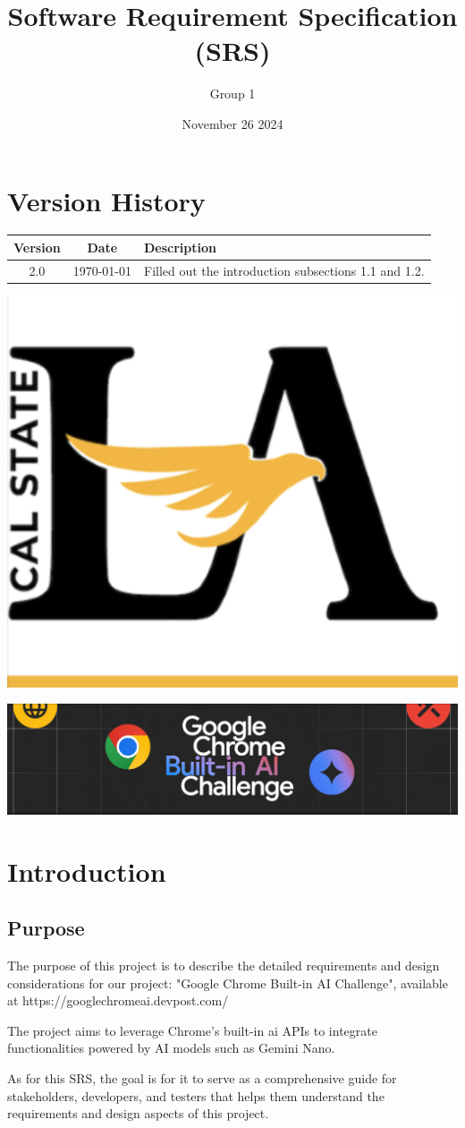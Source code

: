 \documentclass{article}
\title{Software Requirement Specification (SRS)}
\author{Group 1 }
\date{November 26 2024}
\begin{document}
\maketitle  
\pagebreak

\tableofcontents
\pagebreak

\section*{Version History}
\begin{longtable}{|c|c|p{10cm}|}
\hline
\textbf{Version} & \textbf{Date} & \textbf{Description} \\ \hline
2.0 & \today & Filled out the introduction subsections 1.1 and 1.2.  \\ \hline
\end{longtable}
\pagebreak

\includegraphics[width=0.3\linewidth]{../logo/csula.png} 

\includegraphics[width=0.3\linewidth]{../logo/chromeai.png} 

\section{Introduction}
\subsection{Purpose}
The purpose of this project is to describe the detailed requirements and design considerations for our project: "Google Chrome Built-in AI Challenge", available at https://googlechromeai.devpost.com/ 

The project aims to leverage Chrome's built-in \Gls{ai} APIs to integrate functionalities powered by AI models such as Gemini Nano.

As for this SRS, the goal is for it to serve as a comprehensive guide for stakeholders, developers, and testers that helps them understand the requirements and design aspects of this project.
\end{document}
